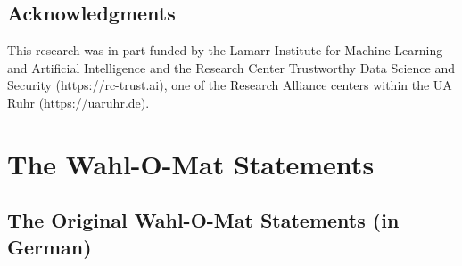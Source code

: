 \documentclass[
	fontsize=10pt,          %
	numbers=noenddot,    	%
    parskip=half,        	%
    listof=totoc,        	%
    bibliography=totoc,  	%
	headsepline=true,       %
	footsepline=false, 		%
    DIV=12                	%
]{scrartcl}
\begin{document}
\subsection*{Acknowledgments}

This research was in part funded by the Lamarr Institute for Machine Learning and Artificial Intelligence and the Research Center Trustworthy Data Science and Security (https://rc-trust.ai), one of the Research Alliance centers within
the UA Ruhr (https://uaruhr.de).






\newpage

\appendix
\section{The Wahl-O-Mat Statements}\label{sec:app WahlOMat}
\subsection{The Original Wahl-O-Mat Statements (in German)}
\end{document}
